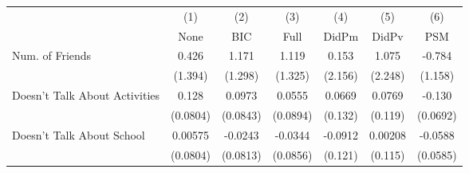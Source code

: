 {
\def\sym#1{\ifmmode^{#1}\else\(^{#1}\)\fi}
\begin{tabular}{l*{6}{c}}
\toprule
            &\multicolumn{1}{c}{(1)}&\multicolumn{1}{c}{(2)}&\multicolumn{1}{c}{(3)}&\multicolumn{1}{c}{(4)}&\multicolumn{1}{c}{(5)}&\multicolumn{1}{c}{(6)}\\
            &\multicolumn{1}{c}{None}&\multicolumn{1}{c}{BIC}&\multicolumn{1}{c}{Full}&\multicolumn{1}{c}{DidPm}&\multicolumn{1}{c}{DidPv}&\multicolumn{1}{c}{PSM}\\
\midrule
Num. of Friends&       0.426         &       1.171         &       1.119         &       0.153         &       1.075         &      -0.784         \\
            &     (1.394)         &     (1.298)         &     (1.325)         &     (2.156)         &     (2.248)         &     (1.158)         \\
\addlinespace
Doesn't Talk About Activities&       0.128         &      0.0973         &      0.0555         &      0.0669         &      0.0769         &      -0.130         \\
            &    (0.0804)         &    (0.0843)         &    (0.0894)         &     (0.132)         &     (0.119)         &    (0.0692)         \\
\addlinespace
Doesn't Talk About School&     0.00575         &     -0.0243         &     -0.0344         &     -0.0912         &     0.00208         &     -0.0588         \\
            &    (0.0804)         &    (0.0813)         &    (0.0856)         &     (0.121)         &     (0.115)         &    (0.0585)         \\
\bottomrule
\end{tabular}
}
